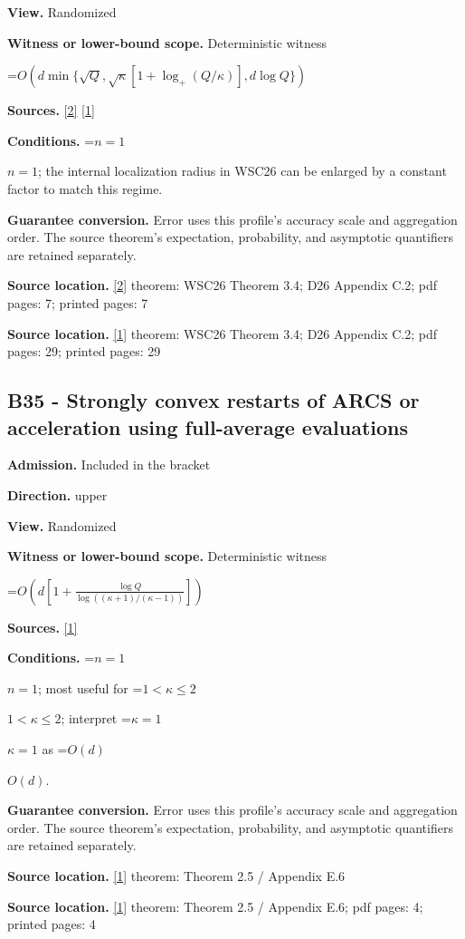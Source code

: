 \documentclass[10pt,a4paper]{article}
\newcommand{\AtlasMath}[1]{\par\begingroup\centering\setbox0=\hbox{$\displaystyle #1$}\ifdim\wd0>1.4\linewidth\typeout{ATLAS WIDE FORMULA: \the\wd0}\fi\ifdim\wd0>\linewidth\resizebox{\linewidth}{!}{\box0}\else\box0\fi\par\endgroup}
\newcommand{\AtlasInlineMath}[1]{\begingroup\setbox0=\hbox{$#1$}\ifdim\wd0>.4\linewidth\endgroup\AtlasMath{#1}\else\endgroup$#1$\fi}
\begin{document}
\textbf{View.} Randomized

\textbf{Witness or lower-bound scope.} Deterministic witness

\AtlasMath{O\!\left(d\min\{\sqrt Q,\sqrt\kappa[1+\log_+(Q/\kappa)],d\log Q\}\right)}
\textbf{Sources.} \href{https://arxiv.org/pdf/2609.18728v2}{[2]} \href{https://arxiv.org/html/2610.00345v1}{[1]}

\textbf{Conditions.} \AtlasInlineMath{n=1}; the internal localization radius in WSC26 can be enlarged by a constant factor to match this regime.

\textbf{Guarantee conversion.} Error uses this profile's accuracy scale and aggregation order. The source theorem's expectation, probability, and asymptotic quantifiers are retained separately.

\textbf{Source location.} \href{https://arxiv.org/pdf/2609.18728v2}{[2]} theorem: WSC26 Theorem 3.4; D26 Appendix C.2; pdf pages: 7; printed pages: 7

\textbf{Source location.} \href{https://arxiv.org/html/2610.00345v1}{[1]} theorem: WSC26 Theorem 3.4; D26 Appendix C.2; pdf pages: 29; printed pages: 29

\subsection{B35 - Strongly convex restarts of ARCS or acceleration using full-average evaluations}
\textbf{Admission.} Included in the bracket

\textbf{Direction.} upper

\textbf{View.} Randomized

\textbf{Witness or lower-bound scope.} Deterministic witness

\AtlasMath{O\!\left(d\left[1+\frac{\log Q}{\log((\kappa+1)/(\kappa-1))}\right]\right)}
\textbf{Sources.} \href{https://arxiv.org/html/2610.00345v1}{[1]}

\textbf{Conditions.} \AtlasInlineMath{n=1}; most useful for \AtlasInlineMath{1<\kappa\le2}; interpret \AtlasInlineMath{\kappa=1} as \AtlasInlineMath{O(d)}.

\textbf{Guarantee conversion.} Error uses this profile's accuracy scale and aggregation order. The source theorem's expectation, probability, and asymptotic quantifiers are retained separately.

\textbf{Source location.} \href{https://arxiv.org/html/2610.00345v1}{[1]} theorem: Theorem 2.5 / Appendix E.6

\textbf{Source location.} \href{https://arxiv.org/html/2610.00345v1}{[1]} theorem: Theorem 2.5 / Appendix E.6; pdf pages: 4; printed pages: 4
\end{document}
